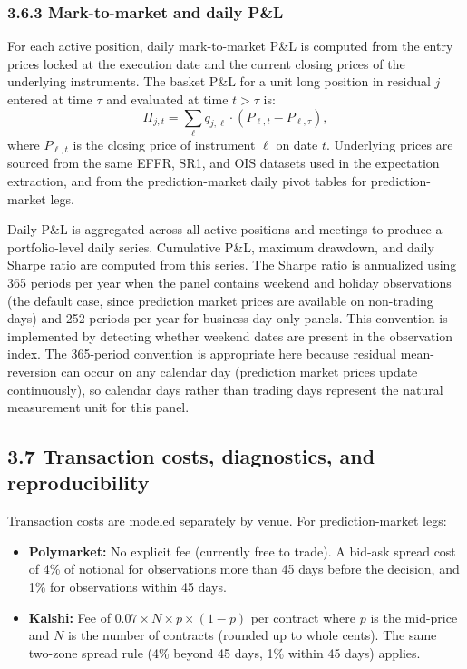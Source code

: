 \subsubsection*{3.6.3 Mark-to-market and daily P\&L}

For each active position, daily mark-to-market P\&L is computed from the entry prices locked at the execution date and the current closing prices of the underlying instruments. The basket P\&L for a unit long position in residual $j$ entered at time $\tau$ and evaluated at time $t > \tau$ is:
\[
\Pi_{j,t} = \sum_\ell q_{j,\ell} \cdot (P_{\ell,t} - P_{\ell,\tau}),
\]
where $P_{\ell,t}$ is the closing price of instrument $\ell$ on date $t$. Underlying prices are sourced from the same EFFR, SR1, and OIS datasets used in the expectation extraction, and from the prediction-market daily pivot tables for prediction-market legs.

Daily P\&L is aggregated across all active positions and meetings to produce a portfolio-level daily series. Cumulative P\&L, maximum drawdown, and daily Sharpe ratio are computed from this series. The Sharpe ratio is annualized using 365 periods per year when the panel contains weekend and holiday observations (the default case, since prediction market prices are available on non-trading days) and 252 periods per year for business-day-only panels. This convention is implemented by detecting whether weekend dates are present in the observation index. The 365-period convention is appropriate here because residual mean-reversion can occur on any calendar day (prediction market prices update continuously), so calendar days rather than trading days represent the natural measurement unit for this panel.

\subsection*{3.7 Transaction costs, diagnostics, and reproducibility}

Transaction costs are modeled separately by venue. For prediction-market legs:
\begin{itemize}
    \item \textbf{Polymarket:} No explicit fee (currently free to trade). A bid-ask spread cost of 4\% of notional for observations more than 45 days before the decision, and 1\% for observations within 45 days.
    \item \textbf{Kalshi:} Fee of $0.07 \times N \times p \times (1-p)$ per contract where $p$ is the mid-price and $N$ is the number of contracts (rounded up to whole cents). The same two-zone spread rule (4\% beyond 45 days, 1\% within 45 days) applies.
\end{itemize}

